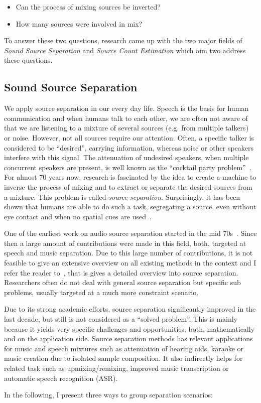 \begin{itemize}
    \item Can the process of mixing sources be inverted? 
    \item How many sources were involved in mix?
\end{itemize}

To answer these two questions, research came up with the two major fields of \emph{Sound Source Separation} and \emph{Source Count Estimation} which aim two address these questions.

\subsection{Sound Source Separation}

We apply source separation in our every day life.
Speech is the basis for human communication and when humans talk to each other, we are often not aware of that we are listening to a mixture of several sources (e.g. from multiple talkers) or noise.
However, not all sources require our attention.
Often, a specific talker is considered to be ``desired'', carrying information, whereas noise or other speakers interfere with this signal.
The attenuation of undesired speakers, when multiple concurrent speakers are present, is well known as the ``cocktail party problem''~\cite{cherry53, haykin05}.
For almost 70 years now, research is fascinated by the idea to create a machine to inverse the process of mixing and to extract or separate the desired sources from a mixture.
This problem is called \emph{source separation}.
Surprisingly, it has been shown that humans are able to do such a task, segregating a  source, even without eye contact and when no spatial cues are used~\cite{bregman90}.
\par
One of the earliest work on audio source separation started in the mid 70s~\cite{miller73}.
Since then a large amount of contributions were made in this field, both, targeted at speech and music separation.
Due to this large number of contributions, it is not feasible to give an extensive overview on all existing methods in the context and I refer the reader to~\cite{vincent18, comon10, rafii}, that is gives a detailed overview into source separation.
Researchers often do not deal with general source separation but specific sub problems, usually targeted at a much more constraint scenario.
\par
Due to its strong academic efforts, source separation significantly improved in the last decade, but still is not considered as a ``solved problem''.
This is mainly because it yields very specific challenges and opportunities, both, mathematically and on the application side. 
Source separation methods has relevant applications for music and speech mixtures such as attenuation of hearing aids, karaoke or music creation due to isolated sample composition.
It also indirectly helps for related task such as upmixing/remixing, improved music transcription or automatic speech recognition (ASR). 
\par
In the following, I present three ways to group separation scenarios:

